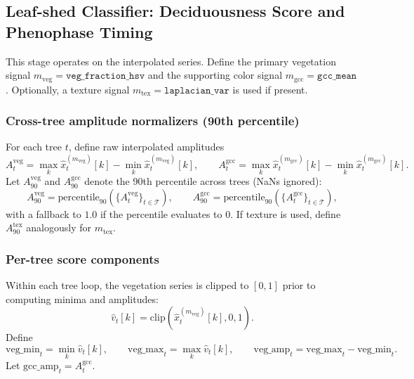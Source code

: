 \documentclass{article}
\begin{document}
\subsection{Leaf-shed Classifier: Deciduousness Score and Phenophase Timing}

This stage operates on the interpolated series. Define the primary vegetation signal
$m_\mathrm{veg}=\texttt{veg\_fraction\_hsv}$ and the supporting color signal
$m_\mathrm{gcc}=\texttt{gcc\_mean}$.
Optionally, a texture signal $m_\mathrm{tex}=\texttt{laplacian\_var}$ is used if present.

\subsubsection{Cross-tree amplitude normalizers (90th percentile)}

For each tree $t$, define raw interpolated amplitudes
\begin{equation}
A_t^{\mathrm{veg}} = \max_{k} \hat{x}^{(m_\mathrm{veg})}_t[k] - \min_{k} \hat{x}^{(m_\mathrm{veg})}_t[k],
\qquad
A_t^{\mathrm{gcc}} = \max_{k} \hat{x}^{(m_\mathrm{gcc})}_t[k] - \min_{k} \hat{x}^{(m_\mathrm{gcc})}_t[k].
\end{equation}
Let $A_{90}^{\mathrm{veg}}$ and $A_{90}^{\mathrm{gcc}}$ denote the 90th percentile across trees (NaNs ignored):
\begin{equation}
A_{90}^{\mathrm{veg}}=\mathrm{percentile}_{90}(\{A_t^{\mathrm{veg}}\}_{t\in\mathcal{T}}),
\qquad
A_{90}^{\mathrm{gcc}}=\mathrm{percentile}_{90}(\{A_t^{\mathrm{gcc}}\}_{t\in\mathcal{T}}),
\end{equation}
with a fallback to $1.0$ if the percentile evaluates to $0$.
If texture is used, define $A_{90}^{\mathrm{tex}}$ analogously for $m_\mathrm{tex}$.

\subsubsection{Per-tree score components}

Within each tree loop, the vegetation series is clipped to $[0,1]$ prior to computing minima and amplitudes:
\begin{equation}
\hat{v}_t[k] = \mathrm{clip}(\hat{x}^{(m_\mathrm{veg})}_t[k],0,1).
\end{equation}
Define
\begin{equation}
\mathrm{veg\_min}_t = \min_{k} \hat{v}_t[k],\qquad
\mathrm{veg\_max}_t = \max_{k} \hat{v}_t[k],\qquad
\mathrm{veg\_amp}_t = \mathrm{veg\_max}_t-\mathrm{veg\_min}_t.
\end{equation}
Let $\mathrm{gcc\_amp}_t=A_t^{\mathrm{gcc}}$.
\end{document}

